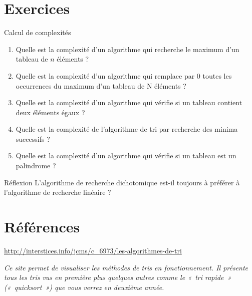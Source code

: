 \section{	Exercices}

	\begin{Exercice}{Calcul de complexités}
			
			\begin{enumerate}[label=\alph*)]
				\item 
					Quelle est la complexité d'un algorithme qui recherche
					le maximum d'un tableau de $n$ éléments ?
				\item 
					Quelle est la complexité d'un algorithme qui remplace
					par 0 toutes les occurrences du maximum d'un tableau
					de N éléments ?
				\item 
					Quelle est la complexité d'un algorithme qui vérifie si
					un tableau contient deux éléments égaux ?
				\item 
					Quelle est la complexité de l'algorithme de tri par
					recherche des minima successifs ?
				\item 
					Quelle est la complexité d'un algorithme qui vérifie si
					un tableau est un palindrome ?
			\end{enumerate}
		\end{Exercice}
		
		\begin{Exercice}{Réflexion}
				L’algorithme de recherche dichotomique est-il toujours à préférer à
				l’algorithme de recherche linéaire ?
		\end{Exercice}


\section{Références}

	\liststyleListv
	\begin{liste}
		\item {
			\url{http://interstices.info/jcms/c_6973/les-algorithmes-de-tri}

			\textit{Ce site permet de visualiser les méthodes de tris en
			fonctionnement. Il présente tous les tris vus en première plus quelques
			autres comme le «~tri rapide~» («~quicksort~») que vous verrez en
			deuxième année. }}
	\end{liste}
